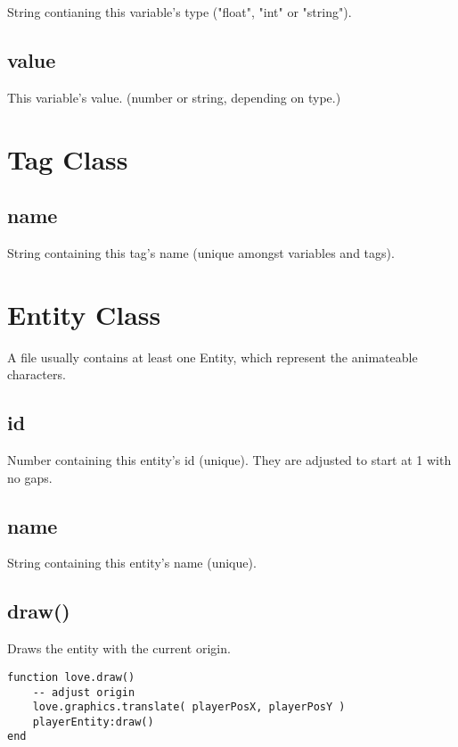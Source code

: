 \documentclass{article}
\begin{document}
String contianing this variable's type ("float", "int" or "string").


\subsection{value}

This variable's value. (number or string, depending on type.)




\newpage

		\section{Tag Class}


\subsection{name}

String containing this tag's name (unique amongst variables and tags).



\newpage

		\section{Entity Class}

A file usually contains at least one Entity, which represent the animateable characters.


\subsection{id}

Number containing this entity's id (unique). They are adjusted to start at 1 with no gaps.


\subsection{name}

String containing this entity's name (unique).


\subsection{draw()}

Draws the entity with the current origin.
\begin{lstlisting}
function love.draw()
	-- adjust origin
	love.graphics.translate( playerPosX, playerPosY )
	playerEntity:draw()
end
\end{lstlisting}
\end{document}
